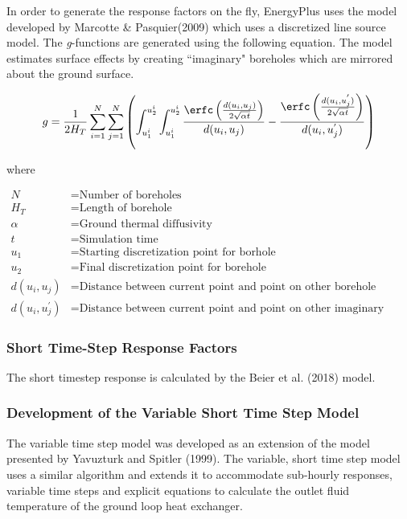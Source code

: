 In order to generate the response factors on the fly, EnergyPlus uses the model developed by Marcotte \& Pasquier(2009) which uses a discretized line source model. The \emph{g}-functions are generated using the following equation. The model estimates surface effects by creating ``imaginary" boreholes which are mirrored about the ground surface.

\begin{equation}
g = \frac{1}{2 H_T} \sum_{i=1}^N \sum_{j=1}^N \left( \int_{u_1^i}^{u_2^i} \int_{u_1^i}^{u_2^i} \frac{\erfc\left( \frac{d(u_i, u_j)}{2\sqrt{\alpha t}}\right)}{d(u_i, u_j)} - \frac{\erfc\left( \frac{d(u_i, u_j^{'})}{2\sqrt{\alpha t}}\right)}{d(u_i, u_j^{'})}\right)
\end{equation}

where

\begin{align}
	N &= \mbox{Number of boreholes} \\
	H_T &= \mbox{Length of borehole} \\
	\alpha &= \mbox{Ground thermal diffusivity} \\
	t &= \mbox{Simulation time} \\
	u_1 &= \mbox{Starting discretization point for borhole} \\
	u_2 &= \mbox{Final discretization point for borehole} \\
	d(u_i, u_j) &= \mbox{Distance between current point and point on other borehole} \\
	d(u_i, u_j^{'}) &= \mbox{Distance between current point and point on other imaginary borehole}
\end{align}


\subsubsection{Short Time-Step Response Factors}\label{short-time-step-response-factors}

The short timestep response is calculated by the Beier et al. (2018) model.

\subsubsection{Development of the Variable Short Time Step Model}\label{development-of-the-variable-short-time-step-model}

The variable time step model was developed as an extension of the model presented by Yavuzturk and Spitler (1999). The variable, short time step model uses a similar algorithm and extends it to accommodate sub-hourly responses, variable time steps and explicit equations to calculate the outlet fluid temperature of the ground loop heat exchanger.

